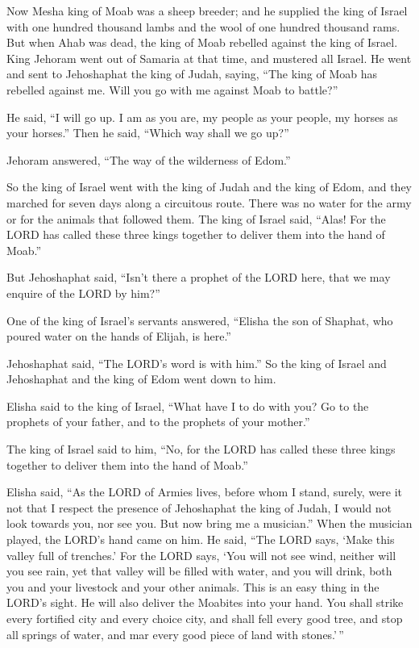  Now Mesha king of Moab was a sheep breeder; and he
supplied the king of Israel with one hundred thousand lambs and the wool
of one hundred thousand rams.  But when Ahab was dead, the
king of Moab rebelled against the king of Israel.  King
Jehoram went out of Samaria at that time, and mustered all Israel.
 He went and sent to Jehoshaphat the king of Judah,
saying, ``The king of Moab has rebelled against me. Will you go with me
against Moab to battle?''

He said, ``I will go up. I am as you are, my people as your people, my
horses as your horses.''  Then he said, ``Which way shall
we go up?''

Jehoram answered, ``The way of the wilderness of Edom.''

 So the king of Israel went with the king of Judah and the
king of Edom, and they marched for seven days along a circuitous route.
There was no water for the army or for the animals that followed them.
 The king of Israel said, ``Alas! For the LORD has called
these three kings together to deliver them into the hand of Moab.''

 But Jehoshaphat said, ``Isn't there a prophet of the
LORD here, that we may enquire of the LORD by him?''

One of the king of Israel's servants answered, ``Elisha the son of
Shaphat, who poured water on the hands of Elijah, is here.''

 Jehoshaphat said, ``The LORD's word is with him.'' So
the king of Israel and Jehoshaphat and the king of Edom went down to
him.

 Elisha said to the king of Israel, ``What have I to do
with you? Go to the prophets of your father, and to the prophets of your
mother.''

The king of Israel said to him, ``No, for the LORD has called these
three kings together to deliver them into the hand of Moab.''

 Elisha said, ``As the LORD of Armies lives, before whom
I stand, surely, were it not that I respect the presence of Jehoshaphat
the king of Judah, I would not look towards you, nor see you.
 But now bring me a musician.'' When the musician played,
the LORD's hand came on him.  He said, ``The LORD says,
`Make this valley full of trenches.'  For the LORD says,
`You will not see wind, neither will you see rain, yet that valley will
be filled with water, and you will drink, both you and your livestock
and your other animals.  This is an easy thing in the
LORD's sight. He will also deliver the Moabites into your hand.
 You shall strike every fortified city and every choice
city, and shall fell every good tree, and stop all springs of water, and
mar every good piece of land with stones.'\,''

